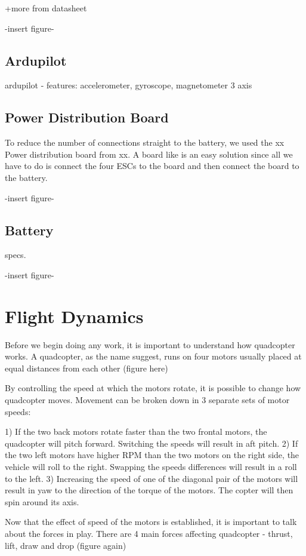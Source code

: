 +more from datasheet

-insert figure-

\subsection{Ardupilot}

ardupilot - features: accelerometer, gyroscope, magnetometer 3 axis

\subsection{Power Distribution Board}
To reduce the number of connections straight to the battery, we used the xx Power distribution board from xx. A board like is an easy solution since all we have to do is connect the four ESCs to the board and then connect the board to the battery.

-insert figure-

\subsection{Battery}
specs.

-insert figure-

\section{Flight Dynamics}
Before we begin doing any work, it is important to understand how quadcopter works. A quadcopter, as the name suggest, runs on four motors usually placed at equal distances from each other (figure here)

By controlling the speed at which the motors rotate, it is possible to change how quadcopter moves. Movement can be broken down in 3 separate sets of motor speeds:

1) If the two back motors rotate faster than the two frontal motors, the quadcopter will pitch forward. Switching the speeds will result in aft pitch.
2) If the two left motors have higher RPM than the two motors on the right side, the vehicle will roll to the right. Swapping the speeds differences will result in a roll to the left.
3) Increasing the speed of one of the diagonal pair of the motors will result in yaw to the direction of the torque of the motors. The copter will then spin around its axis.

Now that the effect of speed of the motors is established, it is important to talk about the forces in play. There are 4 main forces affecting quadcopter - thrust, lift, draw and drop (figure again)

